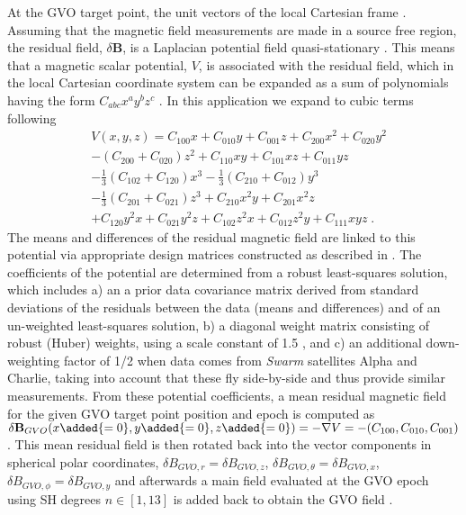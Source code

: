 \documentclass[extra,mreferee]{gji}
\begin{document}
At the GVO target point, the unit vectors of the local Cartesian frame . Assuming that the magnetic field measurements are made in a source free region, the residual field, $\delta \mathbf{B}$, is a Laplacian potential field  quasi-stationary  \citep{Sabaka_etal_2010}. This means that a magnetic scalar potential, $V$, is associated with the residual field, which in the local Cartesian coordinate system can be expanded as a sum of polynomials having the form $C_{abc} x^a y^b z^c$ \citep{Backus_etal_1996}. In this application we expand to cubic terms following  \cite{Hammer_etal_2021a}
\begin{align}
&V(x,y,z) =  C_{100}x + C_{010}y + C_{001}z + C_{200}x^2 + C_{020}y^2  \nonumber \\
& -(C_{200}+C_{020})z^2  + C_{110}xy + C_{101}xz + C_{011}yz    \nonumber \\
&-\frac{1}{3}(C_{102}+C_{120})x^3 -\frac{1}{3}(C_{210}+C_{012})y^3 \nonumber \\
&-\frac{1}{3}(C_{201}+C_{021})z^3 + C_{210}x^2y+ C_{201}x^2z \nonumber \\  
&+ C_{120}y^2x + C_{021}y^2z + C_{102}z^2x + C_{012}z^2y + C_{111}xyz \; . \label{eq:pot_backus} 
\end{align}
The means and differences of the residual magnetic field are linked to this potential via appropriate design matrices constructed as described in \cite{Hammer_etal_2021a}. The coefficients of the potential are determined from a robust least-squares solution, which includes a) an a prior data covariance matrix derived from standard deviations of the residuals between the data (means and differences) and  of an un-weighted least-squares solution, b) a diagonal weight matrix consisting of robust (Huber) weights, using a scale constant of 1.5 \citep[e.g.,][]{Constable_1988}, and c) an additional down-weighting factor of 1/2 when data comes from {\it Swarm} satellites Alpha and Charlie, taking into account that these fly side-by-side and thus provide similar measurements. From these potential coefficients, a mean residual magnetic field for the given GVO target point position and epoch is computed as $\delta \mathbf{B}_{GVO}(x\added{=0},y\added{=0},z\added{=0})=-\nabla V=-(C_{100},C_{010},C_{001})$. This mean residual field is then rotated back into the vector components in spherical polar coordinates, $\delta B_{GVO,r}=\delta B_{GVO,z}$, $\delta B_{GVO,\theta}=\delta B_{GVO,x}$, $\delta B_{GVO,\phi}=\delta B_{GVO,y}$ and afterwards a main field  evaluated at the GVO epoch using SH degrees $n \in [1,13]$ is added back to obtain the GVO field \citep{Hammer_etal_2021a}. 
\end{document}
